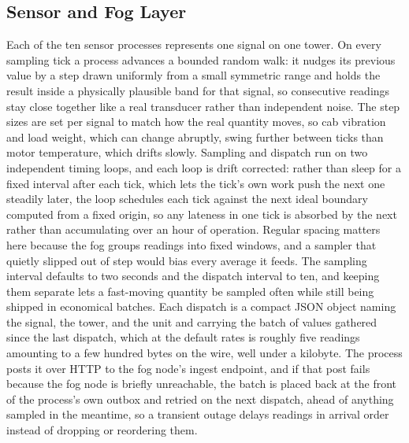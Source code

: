 \documentclass[conference]{IEEEtran}
\begin{document}
\subsection{Sensor and Fog Layer}

Each of the ten sensor processes represents one signal on one tower. On every sampling tick a process advances a bounded random walk: it nudges its previous value by a step drawn uniformly from a small symmetric range and holds the result inside a physically plausible band for that signal, so consecutive readings stay close together like a real transducer rather than independent noise. The step sizes are set per signal to match how the real quantity moves, so cab vibration and load weight, which can change abruptly, swing further between ticks than motor temperature, which drifts slowly. Sampling and dispatch run on two independent timing loops, and each loop is drift corrected: rather than sleep for a fixed interval after each tick, which lets the tick's own work push the next one steadily later, the loop schedules each tick against the next ideal boundary computed from a fixed origin, so any lateness in one tick is absorbed by the next rather than accumulating over an hour of operation. Regular spacing matters here because the fog groups readings into fixed windows, and a sampler that quietly slipped out of step would bias every average it feeds. The sampling interval defaults to two seconds and the dispatch interval to ten, and keeping them separate lets a fast-moving quantity be sampled often while still being shipped in economical batches. Each dispatch is a compact JSON object naming the signal, the tower, and the unit and carrying the batch of values gathered since the last dispatch, which at the default rates is roughly five readings amounting to a few hundred bytes on the wire, well under a kilobyte. The process posts it over HTTP to the fog node's ingest endpoint, and if that post fails because the fog node is briefly unreachable, the batch is placed back at the front of the process's own outbox and retried on the next dispatch, ahead of anything sampled in the meantime, so a transient outage delays readings in arrival order instead of dropping or reordering them.
\end{document}
